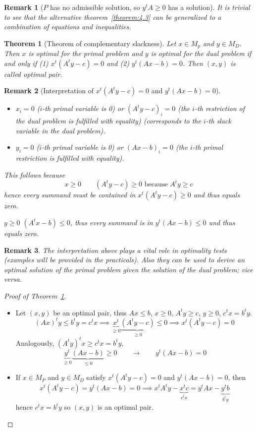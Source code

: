 \documentclass[a4paper]{article}
\newcounter{lecref}[subsection]
\numberwithin{lecref}{subsection}
\newtheorem{theorem}[lecref]{Theorem}
\newtheorem*{Remark}{Remark}
\begin{document}
\begin{Remark}[$P$ has no admissible solution, so $y^t A \geq 0$ has a solution]
	It is trivial to see that the alternative theorem~\ref{theorem:4.3} can be generalized to a combination of equations and inequalities.
\end{Remark}

\begin{theorem}[Theorem of complementary slackness]
	\label{theorem:4.7}
	Let $x \in M_p$ and $y \in M_D$. Then $x$ is optimal for the primal problem and $y$ is optimal for the dual problem
	if and only if (1) $x^t (A^t y - c) = 0$ and (2) $y^t (Ax - b) = 0$. Then $(x, y)$ is called \emph{optimal pair}.
\end{theorem}

\begin{Remark}[Interpretation of $x^t (A^t y - c) = 0$ and $y^t (Ax - b) = 0$]
	\begin{itemize}
		\item $x_i = 0$ ($i$-th primal variable is 0) or $(A^t y - c)_i = 0$ (the $i$-th restriction of the dual problem is fulfilled with equality) (corresponds to the $i$-th slack variable in the dual problem).
		\item $y_i = 0$ ($i$-th primal variable is 0) or $(Ax - b)_i = 0$ (the $i$-th primal restriction is fulfilled with equality).
	\end{itemize}
	This follows because
	\[ x \geq 0 \qquad (A^t y - c) \geq 0 \text{ because } A^t y \geq c \]
	hence every summand must be contained in $x^t (A^ty - c) \geq 0$ and thus equals zero.

	$y \geq 0$ $(A^t x - b) \leq 0$, thus every summand is in $y^t (Ax - b) \leq 0$ und thus equals zero.
\end{Remark}

\begin{Remark}
	The interpretation above plays a vital role in optimality tests (examples will be provided in the practicals).
	Also they can be used to derive an optimal solution of the primal problem given the solution of the dual problem; vice versa.
\end{Remark}

\begin{proof}[Proof of Theorem~\ref{theorem:4.7}]
	\begin{itemize}
		\item
			Let $(x, y)$ be an optimal pair, thus $Ax \leq b$, $x \geq 0$, $A^t y \geq c$, $y \geq 0$, $c^t x = b^t y$.
			\[ (Ax)^t y \leq b^t y = c^t x \implies \underbrace{x^t}_{\geq 0} \underbrace{(A^ty - c)}_{\geq 0} \leq 0 \implies x^t (A^t y - c) = 0 \]
			Analogously, $(A^t y)^t x \geq c^t x = b^t y$,
			\[ \underbrace{y^t}_{\geq 0} \underbrace{(Ax - b)}_{\leq 0} \geq 0 \qquad \to \qquad y^t (Ax - b) = 0 \]
		\item
			If $x \in M_P$ and $y \in M_D$ satisfy $x^t (A^t y - c) = 0$ and $y^t (Ax - b) = 0$,
			then
			\[ x^t (A^t y - c) = y^t (Ax - b) = 0 \implies x^t A^t y - \underbrace{x^t c}_{c^t x} = y^t Ax - \underbrace{y^t b}_{b^t y} \]
			hence $c^t x = b^t y$ so $(x, y)$ is an optimal pair.
	\end{itemize}
\end{proof}
\end{document}
